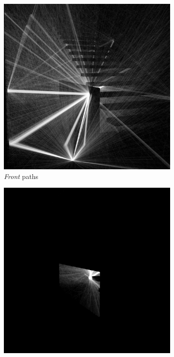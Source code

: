 \begin{figure}
	\centering
	\begin{subfigure}[t]{0.24\linewidth}
		\includegraphics[width=\textwidth]{chapters/chapter_thetool/rays_front}
		\caption{\textit{Front} paths}
		\label{rays_front}
	\end{subfigure}
	\begin{subfigure}[t]{0.24\linewidth}
		\includegraphics[width=\textwidth]{chapters/chapter_thetool/rays_back}

\end{subfigure}
\end{figure}
